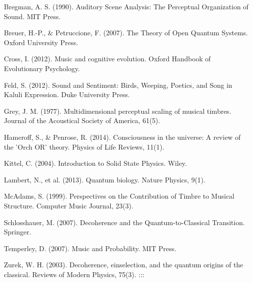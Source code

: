 \documentclass[a4paper,11pt]{article}
\begin{document}
Bregman, A. S. (1990). Auditory Scene Analysis: The Perceptual
Organization of Sound. MIT Press.

Breuer, H.-P., \& Petruccione, F. (2007). The Theory of Open Quantum
Systems. Oxford University Press.

Cross, I. (2012). Music and cognitive evolution. Oxford Handbook of
Evolutionary Psychology.

Feld, S. (2012). Sound and Sentiment: Birds, Weeping, Poetics, and Song
in Kaluli Expression. Duke University Press.

Grey, J. M. (1977). Multidimensional perceptual scaling of musical
timbres. Journal of the Acoustical Society of America, 61(5).

Hameroff, S., \& Penrose, R. (2014). Consciousness in the universe: A
review of the 'Orch OR' theory. Physics of Life Reviews, 11(1).

Kittel, C. (2004). Introduction to Solid State Physics. Wiley.

Lambert, N., et al. (2013). Quantum biology. Nature Physics, 9(1).

McAdams, S. (1999). Perspectives on the Contribution of Timbre to
Musical Structure. Computer Music Journal, 23(3).

Schlosshauer, M. (2007). Decoherence and the Quantum-to-Classical
Transition. Springer.

Temperley, D. (2007). Music and Probability. MIT Press.

Zurek, W. H. (2003). Decoherence, einselection, and the quantum origins
of the classical. Reviews of Modern Physics, 75(3).
:::
\end{document}
